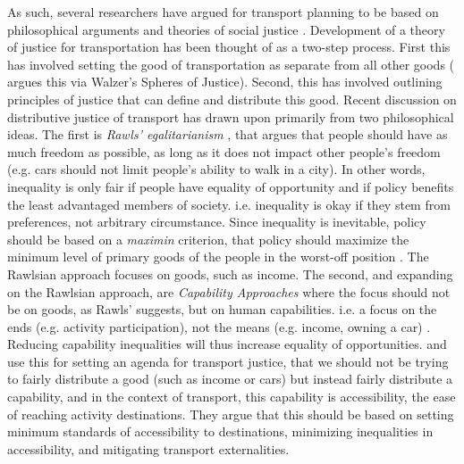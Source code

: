 As such, several researchers have argued for transport planning to be based on philosophical arguments and theories of social justice \cite{banister_inequality_2018,pereira_distributive_2017,martens_transport_2016}. Development of a theory of justice for transportation has been thought of as a two-step process. First this has involved setting the good of transportation as separate from all other goods ( argues this via Walzer's Spheres of Justice). Second, this has involved outlining principles of justice that can define and distribute this good. Recent discussion on distributive justice of transport has drawn upon primarily from two philosophical ideas. The first is \textit{Rawls' egalitarianism} \cite{rawls_theory_1971}, that argues that people should have as much freedom as possible, as long as it does not impact other people's freedom (e.g. cars should not limit people's ability to walk in a city). In other words, inequality is only fair if people have equality of opportunity and if policy benefits the least advantaged members of society. i.e. inequality is okay if they stem from preferences, not arbitrary circumstance. Since inequality is inevitable, policy should be based on a \textit{maximin} criterion, that policy should maximize the minimum level of primary goods of the people in the worst-off position \cite{martens_transport_2016}. The Rawlsian approach focuses on goods, such as income. The second, and expanding on the Rawlsian approach, are \textit{Capability Approaches} where the focus should not be on goods, as Rawls' suggests, but on human capabilities. i.e. a focus on the ends (e.g. activity participation), not the means (e.g. income, owning a car) \cite{sen_human_2005}. Reducing capability inequalities will thus increase equality of opportunities.  and  use this for setting an agenda for transport justice, that we should not be trying to fairly distribute a good (such as income or cars) but instead fairly distribute a capability, and in the context of transport, this capability is accessibility, the ease of reaching activity destinations. They argue that this should be based on setting minimum standards of accessibility to destinations, minimizing inequalities in accessibility, and mitigating transport externalities. 

